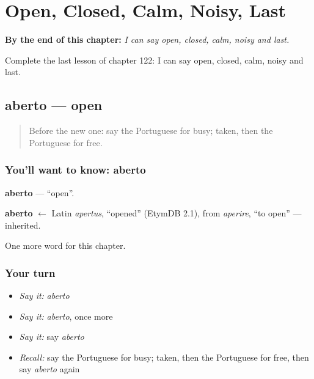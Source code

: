 
\chapter{Open, Closed, Calm, Noisy, Last}
\label{ch:pt-open-closed-calm-noisy-last}

\begin{chapteropening}
\textbf{By the end of this chapter:} \emph{I can say open, closed, calm, noisy and last.}

Complete the last lesson of chapter 122: I can say open, closed, calm, noisy and last.
\end{chapteropening}

\section[aberto]{aberto — open}

\label{lesson:PT-C122-aberto}



\begin{quote}
Before the new one: say the Portuguese for busy; taken, then the Portuguese for free.
\end{quote}

\subsection*{You'll want to know: aberto}
\textbf{aberto} — \textquotedblleft{}open\textquotedblright{}.

\begin{cousinweb}
\textbf{aberto} $\leftarrow$ Latin \emph{apertus}, \textquotedblleft{}opened\textquotedblright{} (EtymDB 2.1), from \emph{aperire}, \textquotedblleft{}to open\textquotedblright{} — inherited.
\end{cousinweb}

\begin{grammarlens}[title={What you've built}]
One more word for this chapter.
\end{grammarlens}

\subsection*{Your turn}
\begin{itemize}
\raggedright
  \item \emph{Say it:} \emph{aberto}
  \item \emph{Say it:} \emph{aberto}, once more
  \item \emph{Say it:} say \emph{aberto}
  \item \emph{Recall:} say the Portuguese for busy; taken, then the Portuguese for free, then say \emph{aberto} again
\end{itemize}


